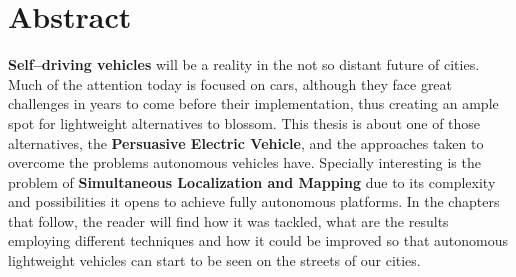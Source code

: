 


\begingroup
\let\clearpage\relax
\let\cleardoublepage\relax
\let\cleardoublepage\relax

\chapter*{Abstract}
\textbf{Self--driving vehicles} will be a reality in the not so distant future of cities. Much of the attention today is focused on cars, although they face great challenges in years to come before their implementation, thus creating an ample spot for lightweight alternatives to blossom. This thesis is about one of those alternatives, the \textbf{Persuasive Electric Vehicle}, and the approaches taken to overcome the problems autonomous vehicles have. Specially interesting is the problem of \textbf{Simultaneous Localization and Mapping} due to its complexity and possibilities it opens to achieve fully autonomous platforms. In the chapters that follow, the reader will find how it was tackled, what are the results employing different techniques and how it could be improved so that autonomous lightweight vehicles can start to be seen on the streets of our cities.\bigskip


\endgroup			

\vfill
